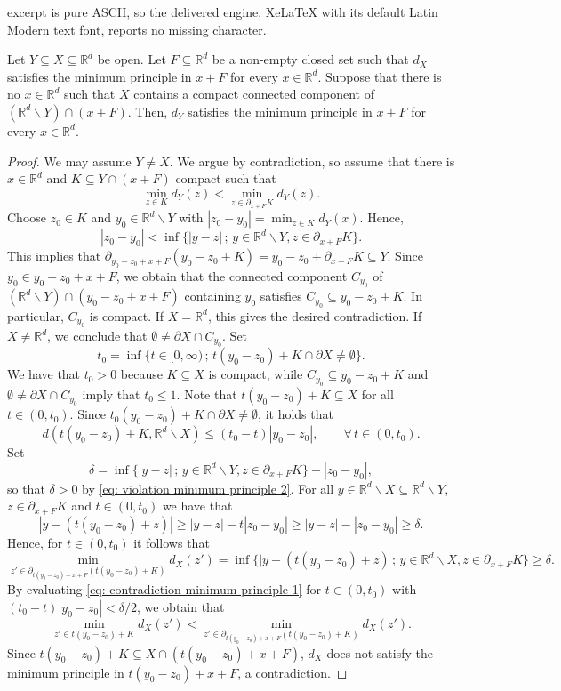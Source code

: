 \documentclass[10pt,a4paper]{amsart}
\newcommand{\R}{\mathbb{R}}
\begin{document}
excerpt is pure ASCII, so the delivered engine, XeLaTeX with its default Latin Modern text font, reports no missing character.
\begin{lemma}\label{lem: entailing minimum principle}
	Let $Y \subseteq X\subseteq\R^d$ be open. Let $F\subseteq\R^d$ be  a non-empty closed set such that $d_X$ satisfies the minimum principle in $x+F$ for every $x\in\R^d$. Suppose that there is no $x\in\R^d$ such that $X$ contains a compact connected component of $(\R^d\backslash Y)\cap (x+F)$. Then, $d_Y$ satisfies the minimum principle in $x+F$ for every $x\in\R^d$.
\end{lemma}

\begin{proof}
	We may assume $Y\neq X$. We argue by contradiction, so assume that there is $x\in \R^d$ and  $K\subseteq Y\cap(x+F)$ compact such that
$$
		\min_{z\in K}d_Y(z)<\min_{z\in\partial_{x+F}K}d_Y(z).
$$
	Choose $z_0\in K$ and $y_0\in\R^d\backslash Y$ with $|z_0-y_0|=\min_{z\in K}d_Y(x)$.
Hence,
	\begin{equation}\label{eq: violation minimum principle 2}
		|z_0-y_0|<\inf\{|y-z| \,; \, y\in\R^d\backslash Y, z\in \partial_{x+F}K\}.
	\end{equation}
	This implies that $\partial_{y_0-z_0+x+F}(y_0-z_0+K) = y_0-z_0+\partial_{x+F}K \subseteq Y$. Since $y_0 \in y_0-z_0+x+F$, we obtain that the connected component $C_{y_0}$ of $(\R^d\backslash Y)\cap (y_0-z_0+x+F)$ containing $y_0$ satisfies $C_{y_0}\subseteq y_0-z_0+K$. In particular, $C_{y_0}$ is compact. If $X=\R^d$, this gives the desired contradiction. 	If $X\neq\R^d$, we conclude that $\emptyset\neq\partial X\cap C_{y_0}$. Set
	$$t_0=\inf\{t\in[0,\infty) \, ; \,t(y_0-z_0)+K\cap\partial X\neq \emptyset\}.$$
 We have that $t_0 > 0$ because $K \subseteq X$ is compact, while  $C_{y_0}\subseteq y_0-z_0+K$ and $\emptyset\neq\partial X\cap C_{y_0}$ imply that $t_0 \leq 1$. Note that $t(y_0-z_0)+K\subseteq X$ for all $t \in (0,t_0)$. Since $t_0(y_0-z_0)+K\cap\partial X\neq \emptyset$, it holds that
	\begin{equation}\label{eq: contradiction minimum principle 1}
	 d\left(t(y_0-z_0)+K, \R^d\backslash X\right)\leq (t_0-t)|y_0-z_0|, \qquad 	\forall\,t\in (0,t_0).
	\end{equation}
	Set 
	$$\delta=\inf\{|y-z|\, ; \, y\in\R^d\backslash Y, z\in \partial_{x+F}K\}-|z_0-y_0|,$$
	so that $\delta>0$ by \eqref{eq: violation minimum principle 2}. For all $y\in \R^d\backslash X\subseteq\R^d\backslash Y$, $z\in \partial_{x+F}K$ and $t\in (0,t_0)$ we have that
	$$|y-\left(t(y_0-z_0)+z\right)|\geq |y-z|-t|z_0-y_0|\geq|y-z|-|z_0-y_0|\geq\delta.$$
	Hence, for $t\in (0,t_0)$ it follows that
	$$\min_{z'\in\partial_{t(y_0-z_0)+x+F}(t(y_0-z_0)+K)}d_X(z')=\inf\{|y-\left(t(y_0-z_0)+z\right)\,; \, y\in\R^d\backslash X, z\in \partial_{x+F}K\}\geq \delta.$$
	By evaluating \eqref{eq: contradiction minimum principle 1} for $t\in(0,t_0)$ with $(t_0-t)|y_0-z_0|<\delta/2$, we obtain that
	$$\min_{z'\in t(y_0-z_0)+K}d_X(z')<\min_{z'\in\partial_{t(y_0-z_0)+x+F}(t(y_0-z_0)+K)}d_X(z').$$
	Since $t(y_0-z_0)+K \subseteq X \cap (t(y_0-z_0)+ x+ F)$, $d_X$ does not satisfy the minimum principle in $t(y_0-z_0)+ x+ F$, a contradiction.
\end{proof}
\end{document}
